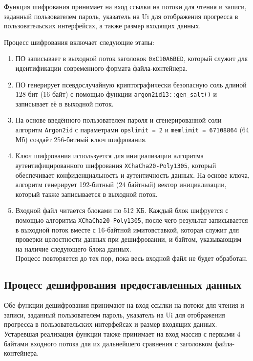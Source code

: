\documentclass[12pt,a4paper]{article}
\begin{document}
Функция шифрования принимает на вход ссылки на потоки для чтения и записи, заданный пользователем пароль, указатель на Ui для отображения прогресса в пользовательских интерфейсах, а также размер входящих данных.

Процесс шифрования включает следующие этапы:
\begin{enumerate}
    \item ПО записывает в выходной поток заголовок \texttt{0xC10A6BED}, который служит для идентификации современного формата файла-контейнера.
    \item ПО генерирует псевдослучайную криптографически безопасную соль длиной 128 бит (16 байт) с помощью функции \texttt{argon2id13::gen\_salt()} и записывает её в выходной поток.
    \item На основе введённого пользователем пароля и сгенерированной соли алгоритм \texttt{Argon2id} с параметрами \texttt{opslimit = 2} и \texttt{memlimit = 67108864} (64 Мб) создаёт 256-битный ключ шифрования.
    \item Ключ шифрования используется для инициализации алгоритма аутентифицированного шифрования \texttt{XChaCha20-Poly1305}, который обеспечивает конфиденциальность и аутентичность данных. На основе ключа, алгоритм генерирует 192-битный (24 байтный) вектор инициализации, который также записывается в выходной поток.
    \item Входной файл читается блоками по 512 КБ. Каждый блок шифруется с помощью алгоритма \texttt{XChaCha20-Poly1305}, после чего результат записывается в выходной поток вместе с 16-байтной имитовставкой, которая служит для проверки целостности данных при дешифровании, и байтом, указывающим на наличие следующего блока данных. \\
    Процесс повторяется до тех пор, пока весь входной файл не будет обработан.
\end{enumerate}

\subsection*{Процесс дешифрования предоставленных данных}

Обе функции дешифрования принимают на вход ссылки на потоки для чтения и записи, заданный пользователем пароль, указатель на Ui для отображения прогресса в пользовательских интерфейсах и размер входящих данных. Устаревшая реализация функции также принимает на вход массив с первыми 4 байтами входного потока для их дальнейшего сравнения с заголовком файла-контейнера.
\end{document}
